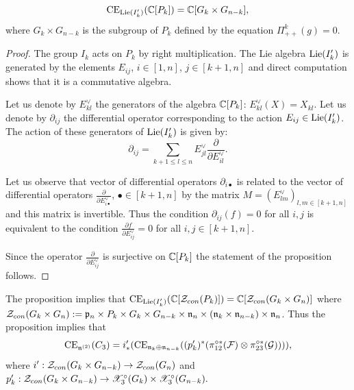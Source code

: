 \begin{proposition}
$$\mathrm{CE}_{\mathrm{Lie}(I'_k)}(\mathbb{C}[P_k])=\mathbb{C}[G_k\times G_{n-k}],$$
where $G_k\times G_{n-k}$ is the subgroup of $P_k$ defined by the equation $\Pi_{++}^k(g)=0$.
\end{proposition}
\begin{proof}
The group $I_k$ acts on $P_k$ by right multiplication. The Lie algebra $\mathrm{Lie}(I'_k)$ is generated by the elements $E_{ij}$, $i\in [1,n]$, $j\in [k+1,n]$ and direct computation
shows that it is a commutative algebra.

Let us denote by $E^\vee_{kl}$ the generators of the algebra $\mathbb{C}[P_k]$:
$E^\vee_{kl}(X)=X_{kl}.$ Let us denote by $\partial_{ij}$ the differential operator corresponding to the action $E_{ij}\in \mathrm{Lie}(I_k')$.
The action of these generators of $\mathrm{Lie}(I'_k)$ is given by:
$$ \partial_{ij}=\sum_{k+1\le l \le n} E_{jl}^\vee\frac{\partial}{\partial E_{il}^\vee}.$$

Let us observe that vector of differential operators $\partial_{i\bullet}$ is related to the vector of differential operators $\frac{\partial}{\partial E_{i\bullet}^\vee}$, $\bullet\in [k+1,n]$ by the matrix
$M=(E^\vee_{lm})_{l,m\in [k+1,n]}$ and this matrix is invertible. Thus the condition $\partial_{ij}(f)=0$ for all $i,j$ is equivalent to the condition
$\frac{\partial f}{\partial E_{ij}^\vee}=0$ for all $i,j\in [k+1,n]$.

Since the operator $\frac{\partial}{\partial E_{ij}^\vee}$ is surjective on $\mathbb{C}[P_k]$ the statement of the proposition follows.
\end{proof}

The proposition implies that $\mathrm{CE}_{\mathrm{Lie}(I'_k)}(\mathbb{C}[\mathcal{Z}_{con}(P_k)])=\mathbb{C}[\mathcal{Z}_{con}(G_k\times G_n)]$ where $\mathcal{Z}_{con}(G_k\times G_n):=\mathfrak{p}_n\times P_k\times G_k\times G_{n-k}\times \mathfrak{n}_n\times (\mathfrak{n}_k\times \mathfrak{n}_{n-k})\times \mathfrak{n}_n$.
Thus the proposition implies that
$$ \mathrm{CE}_{\mathfrak{n}^{(2)}}(C_3)=i'_*(\mathrm{CE}_{\mathfrak{n}_k\oplus \mathfrak{n}_{n-k}}((p'_k)^*(\pi_{12}^{\circ*}(\mathcal{F})\otimes\pi_{23}^{\circ*}(\mathcal{G})))),$$
where $i': \mathcal{Z}_{con}(G_k\times G_{n-k})\to \mathcal{Z}_{con}(G_n)$ and $p'_k:\mathcal{Z}_{con}(G_k\times G_{n-k})\to \mathscr{X}^{\circ}_3(G_k)\times \mathscr{X}^{\circ}_3(G_{n-k}).$






